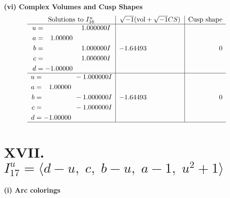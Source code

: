 \documentclass[1p]{elsarticle_modified}
\theoremstyle{definition}
\newcommand{\I}{\sqrt{-1}}
\begin{document}
\newpage\flushleft \textbf{(vi) Complex Volumes and Cusp Shapes}
$$\begin{array}{c|c|c}  
\text{Solutions to }I^u_{16}& \I (\text{vol} + \sqrt{-1}CS) & \text{Cusp shape}\\
 \hline 
\begin{aligned}
u &= \phantom{-0.000000 -}1.000000 I \\
a &= \phantom{-}1.00000\phantom{ +0.000000I} \\
b &= \phantom{-0.000000 -}1.000000 I \\
c &= \phantom{-0.000000 -}1.000000 I \\
d &= -1.00000\phantom{ +0.000000I}\end{aligned}
 & -1.64493\phantom{ +0.000000I} & \phantom{-0.000000 } 0 \\ \hline\begin{aligned}
u &= \phantom{-0.000000 } -1.000000 I \\
a &= \phantom{-}1.00000\phantom{ +0.000000I} \\
b &= \phantom{-0.000000 } -1.000000 I \\
c &= \phantom{-0.000000 } -1.000000 I \\
d &= -1.00000\phantom{ +0.000000I}\end{aligned}
 & -1.64493\phantom{ +0.000000I} & \phantom{-0.000000 } 0\\
 \hline 
 \end{array}$$\newpage\newpage\renewcommand{\arraystretch}{1}
\centering \section*{XVII. $I^u_{17}= \langle d- u,\;c,\;b- u,\;a-1,\;u^2+1 \rangle$}
\flushleft \textbf{(i) Arc colorings}\\
\end{document}
